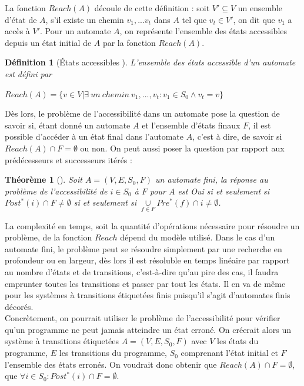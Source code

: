 \documentclass[a4paper]{report}
\theoremstyle{break}
\newtheorem{defin}{Définition}
\theoremstyle{breakplain}
\newtheorem{theo}{Théorème}
\begin{document}
La fonction $Reach(A)$ découle de cette définition : soit $V' \subseteq V$ un ensemble d'état de $A$, s'il existe un chemin $v_1,...v_t$ dans $A$ tel que $v_t \in V'$, on dit que $v_1$ a accès à $V'$. Pour un automate $A$, on représente l'ensemble des états accessibles depuis un état initial de $A$ par la fonction $Reach(A)$.

\begin{defin}[États accessibles \cite{geeraerts2013multiprocessor}]
L'ensemble des états accessible d'un automate est défini par 
\begin{center}
$Reach(A) = \{v \in V | \exists\ un\ chemin\ v_1,...,v_t : v_1 \in S_0 \wedge v_t = v\}$
\end{center}
\end{defin}

Dès lors, le problème de l'accessibilité dans un automate pose la question de savoir si, étant donné un automate $A$ et l'ensemble d'états finaux $F$, il est possible d'accéder à un état final dans l'automate $A$, c'est à dire, de savoir si $Reach(A) \cap F = \emptyset$ ou non. On peut aussi poser la question par rapport aux prédécesseurs et successeurs itérés :

\begin{theo}[\cite{doyen2010antichain}]
Soit $A = (V,E,S_0,F)$ un automate fini, la réponse au problème de l'accessibilité de $i \in S_0$ à $F$ pour $A$ est Oui si et seulement si $Post^*(i) \cap F \neq \emptyset$ si et seulement si $\underset{f \in F}{\cup}Pre^*(f) \cap i \neq \emptyset$.
\end{theo}

La complexité en temps, soit la quantité d'opérations nécessaire pour résoudre un problème, de la fonction $Reach$ dépend du modèle utilisé. Dans le cas d'un automate fini, le problème peut se résoudre simplement par une recherche en profondeur ou en largeur, dès lors il est résoluble en temps linéaire par rapport au nombre d'états et de transitions, c'est-à-dire qu'au pire des cas, il faudra emprunter toutes les transitions et passer par tout les états. Il en va de même pour les systèmes à transitions étiquetées finis puisqu'il s'agit d'automates finis décorés.\\

Concrètement, on pourrait utiliser le problème de l'accessibilité pour vérifier qu'un programme ne peut jamais atteindre un état erroné. On créerait alors un système à transitions étiquetées $A = (V, E, S_0, F)$ avec $V$ les états du programme, $E$ les transitions du programme, $S_0$ comprenant l'état initial et $F$ l'ensemble des états erronés. On voudrait donc obtenir que $Reach(A) \cap F = \emptyset$, que $\forall i \in S_0 : Post^*(i) \cap F = \emptyset$.
\end{document}
